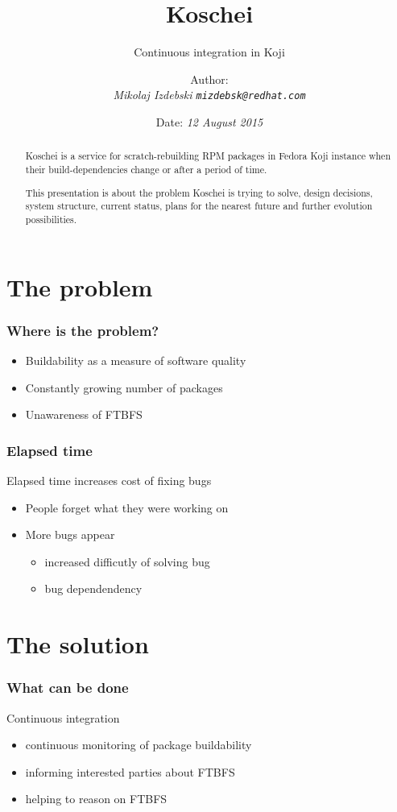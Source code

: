 \documentclass[pdftex,unicode,xcolor=table]{beamer}
\title{Koschei}
\subtitle{Continuous integration in Koji}
\author{Author: \\
  \em{Mikolaj Izdebski}
  \tt{mizdebsk@redhat.com}}
\date{Date: \em{12 August 2015}}
\begin{document}
\begin{rhbg}
  \begin{frame}
    \titlepage
    \begin{abstract}
Koschei is a service for scratch-rebuilding RPM packages in Fedora Koji
instance when their build-dependencies change or after a period of time.

This presentation is about the problem Koschei is trying to solve, design decisions,
system structure, current status, plans for the nearest future and further
evolution possibilities.
    \end{abstract}
  \end{frame}
\end{rhbg}


\section{The problem}
\Large
\begin{frame}
  \frametitle{Where is the problem?}
  \begin{itemize}
  \item Buildability as a measure of software quality
  \item Constantly growing number of packages
  \item Unawareness of FTBFS
  \end{itemize}
\end{frame}

\begin{frame}
  \frametitle{Elapsed time}
  Elapsed time increases cost of fixing bugs
  \begin{itemize}
  \item People forget what they were working on
  \item More bugs appear
    \begin{itemize}
      \item increased difficutly of solving bug
      \item bug dependendency
    \end{itemize}
  \end{itemize}
\end{frame}


\section{The solution}
\Large
\begin{frame}
  \frametitle{What can be done}
  Continuous integration
  \begin{itemize}
    \item continuous monitoring of package buildability
    \item informing interested parties about FTBFS
    \item helping to reason on FTBFS
  \end{itemize}
\end{frame}
\end{document}
